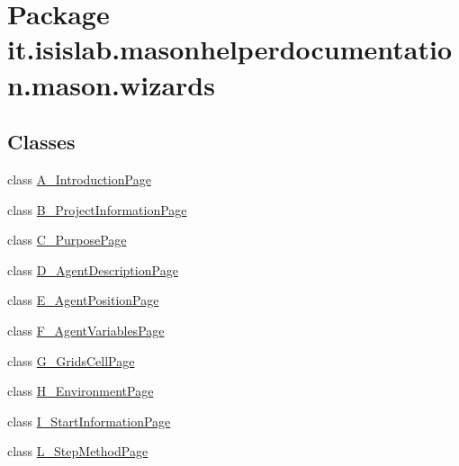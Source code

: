 \hypertarget{namespaceit_1_1isislab_1_1masonhelperdocumentation_1_1mason_1_1wizards}{\section{Package it.\-isislab.\-masonhelperdocumentation.\-mason.\-wizards}
\label{namespaceit_1_1isislab_1_1masonhelperdocumentation_1_1mason_1_1wizards}
}
\subsection*{Classes}
\begin{DoxyCompactItemize}
\item 
class \hyperlink{classit_1_1isislab_1_1masonhelperdocumentation_1_1mason_1_1wizards_1_1_a___introduction_page}{A\-\_\-\-Introduction\-Page}
\item 
class \hyperlink{classit_1_1isislab_1_1masonhelperdocumentation_1_1mason_1_1wizards_1_1_b___project_information_page}{B\-\_\-\-Project\-Information\-Page}
\item 
class \hyperlink{classit_1_1isislab_1_1masonhelperdocumentation_1_1mason_1_1wizards_1_1_c___purpose_page}{C\-\_\-\-Purpose\-Page}
\item 
class \hyperlink{classit_1_1isislab_1_1masonhelperdocumentation_1_1mason_1_1wizards_1_1_d___agent_description_page}{D\-\_\-\-Agent\-Description\-Page}
\item 
class \hyperlink{classit_1_1isislab_1_1masonhelperdocumentation_1_1mason_1_1wizards_1_1_e___agent_position_page}{E\-\_\-\-Agent\-Position\-Page}
\item 
class \hyperlink{classit_1_1isislab_1_1masonhelperdocumentation_1_1mason_1_1wizards_1_1_f___agent_variables_page}{F\-\_\-\-Agent\-Variables\-Page}
\item 
class \hyperlink{classit_1_1isislab_1_1masonhelperdocumentation_1_1mason_1_1wizards_1_1_g___grids_cell_page}{G\-\_\-\-Grids\-Cell\-Page}
\item 
class \hyperlink{classit_1_1isislab_1_1masonhelperdocumentation_1_1mason_1_1wizards_1_1_h___environment_page}{H\-\_\-\-Environment\-Page}
\item 
class \hyperlink{classit_1_1isislab_1_1masonhelperdocumentation_1_1mason_1_1wizards_1_1_i___start_information_page}{I\-\_\-\-Start\-Information\-Page}
\item 
class \hyperlink{classit_1_1isislab_1_1masonhelperdocumentation_1_1mason_1_1wizards_1_1_l___step_method_page}{L\-\_\-\-Step\-Method\-Page}

\end{DoxyCompactItemize}
